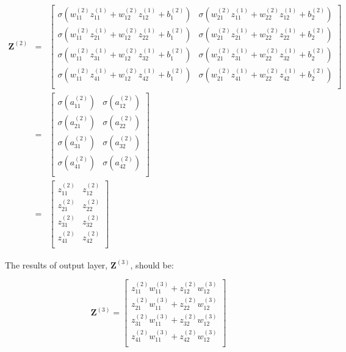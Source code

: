 \begin{eqnarray}
\mathbf{Z}^{(2)} 
& = & \left[\begin{array}{ccc}
	\sigma(w^{(2)}_{11}z^{(1)}_{11} + w^{(2)}_{12}z^{(1)}_{12} + b^{(2)}_1) &
	\sigma(w^{(2)}_{21}z^{(1)}_{11} + w^{(2)}_{22}z^{(1)}_{12} + b^{(2)}_2) \\
	\sigma(w^{(2)}_{11}z^{(1)}_{21} + w^{(2)}_{12}z^{(1)}_{22} + b^{(2)}_1) &
	\sigma(w^{(2)}_{21}z^{(1)}_{21} + w^{(2)}_{22}z^{(1)}_{22} + b^{(2)}_2) \\
	\sigma(w^{(2)}_{11}z^{(1)}_{31} + w^{(2)}_{12}z^{(1)}_{32} + b^{(2)}_1) &
	\sigma(w^{(2)}_{21}z^{(1)}_{31} + w^{(2)}_{22}z^{(1)}_{32} + b^{(2)}_2) \\
	\sigma(w^{(2)}_{11}z^{(1)}_{41} + w^{(2)}_{12}z^{(1)}_{42} + b^{(2)}_1) &
	\sigma(w^{(2)}_{21}z^{(1)}_{41} + w^{(2)}_{22}z^{(1)}_{42} + b^{(2)}_2) \\
\end{array}
\right] \nonumber \\
& = & \left[\begin{array}{ccc}	
	\sigma(a^{(2)}_{11}) & \sigma(a^{(2)}_{12}) \\
	\sigma(a^{(2)}_{21}) & \sigma(a^{(2)}_{22}) \\
	\sigma(a^{(2)}_{31}) & \sigma(a^{(2)}_{32}) \\
	\sigma(a^{(2)}_{41}) & \sigma(a^{(2)}_{42}) \\
\end{array}
\right] \nonumber \\
& = & \left[\begin{array}{ccc}	
	z^{(2)}_{11} & z^{(2)}_{12} \\
	z^{(2)}_{21} & z^{(2)}_{22} \\
	z^{(2)}_{31} & z^{(2)}_{32} \\
	z^{(2)}_{41} & z^{(2)}_{42} \\
\end{array}
\right]
\end{eqnarray}

\noindent The results of output layer, $\mathbf{Z}^{(3)}$, should be:

\begin{equation}
\mathbf{Z}^{(3)} = \left[\begin{array}{c}
	z^{(2)}_{11}w^{(3)}_{11} + z^{(2)}_{12}w^{(3)}_{12} \\
	z^{(2)}_{21}w^{(3)}_{11} + z^{(2)}_{22}w^{(3)}_{12} \\
	z^{(2)}_{31}w^{(3)}_{11} + z^{(2)}_{32}w^{(3)}_{12} \\
	z^{(2)}_{41}w^{(3)}_{11} + z^{(2)}_{42}w^{(3)}_{12} \\
\end{array}
\right]
\end{equation}

